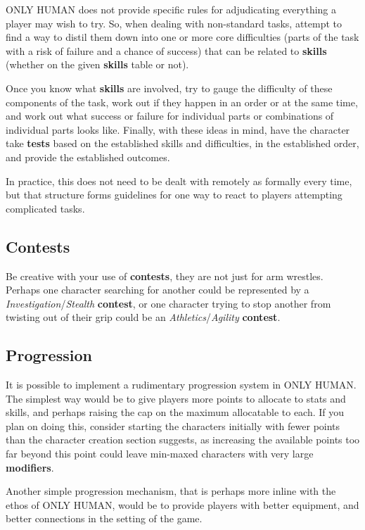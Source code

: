 \documentclass[11pt]{article}
\begin{document}
\begin{multicols}{3}
  ONLY HUMAN does not provide specific rules for adjudicating everything a player may wish to try. So, when dealing with non-standard tasks, attempt to find a way to distil them down into one or more core difficulties (parts of the task with a risk of failure and a chance of success) that can be related to \textbf{skills} (whether on the given \textbf{skills} table or not).

  Once you know what \textbf{skills} are involved, try to gauge the difficulty of these components of the task, work out if they happen in an order or at the same time, and work out what success or failure for individual parts or combinations of individual parts looks like. Finally, with these ideas in mind, have the character take \textbf{tests} based on the established skills and difficulties, in the established order, and provide the established outcomes.

  In practice, this does not need to be dealt with remotely as formally every time, but that structure forms guidelines for one way to react to players attempting complicated tasks.

  \subsection*{Contests}

  Be creative with your use of \textbf{contests}, they are not just for arm wrestles. Perhaps one character searching for another could be represented by a \textit{Investigation}/\textit{Stealth} \textbf{contest}, or one character trying to stop another from twisting out of their grip could be an \textit{Athletics}/\textit{Agility} \textbf{contest}.

  \subsection*{Progression}

  It is possible to implement a rudimentary progression system in ONLY HUMAN. The simplest way would be to give players more points to allocate to stats and skills, and perhaps raising the cap on the maximum allocatable to each. If you plan on doing this, consider starting the characters initially with fewer points than the character creation section suggests, as increasing the available points too far beyond this point could leave min-maxed characters with very large \textbf{modifiers}.

  Another simple progression mechanism, that is perhaps more inline with the ethos of ONLY HUMAN, would be to provide players with better equipment, and better connections in the setting of the game.

\end{multicols}
\end{document}
